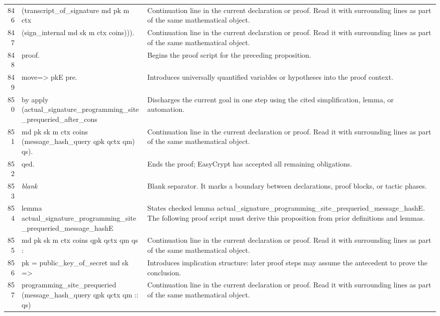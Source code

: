 \documentclass[10pt]{article}
\begin{document}
\begin{longtable}{r L{0.53\textwidth} L{0.37\textwidth}}
846 & {\ttfamily\scriptsize       (transcript\_of\_signature md pk m ctx} & Continuation line in the current declaration or proof.  Read it with surrounding lines as part of the same mathematical object. \\
847 & {\ttfamily\scriptsize         (sign\_internal md sk m ctx coins))).} & Continuation line in the current declaration or proof.  Read it with surrounding lines as part of the same mathematical object. \\
848 & {\ttfamily\scriptsize proof.} & Begins the proof script for the preceding proposition. \\
849 & {\ttfamily\scriptsize move=> pkE pre.} & Introduces universally quantified variables or hypotheses into the proof context. \\
850 & {\ttfamily\scriptsize by apply (actual\_signature\_programming\_site\_prequeried\_after\_cons} & Discharges the current goal in one step using the cited simplification, lemma, or automation. \\
851 & {\ttfamily\scriptsize             md pk sk m ctx coins (message\_hash\_query qpk qctx qm) qs).} & Continuation line in the current declaration or proof.  Read it with surrounding lines as part of the same mathematical object. \\
852 & {\ttfamily\scriptsize qed.} & Ends the proof; EasyCrypt has accepted all remaining obligations. \\
853 & {\ttfamily\scriptsize \emph{blank}} & Blank separator.  It marks a boundary between declarations, proof blocks, or tactic phases. \\
854 & {\ttfamily\scriptsize lemma actual\_signature\_programming\_site\_prequeried\_message\_hashE} & States checked lemma actual\_signature\_programming\_site\_prequeried\_message\_hashE.  The following proof script must derive this proposition from prior definitions and lemmas. \\
855 & {\ttfamily\scriptsize   md pk sk m ctx coins qpk qctx qm qs :} & Continuation line in the current declaration or proof.  Read it with surrounding lines as part of the same mathematical object. \\
856 & {\ttfamily\scriptsize   pk = public\_key\_of\_secret md sk =>} & Introduces implication structure: later proof steps may assume the antecedent to prove the conclusion. \\
857 & {\ttfamily\scriptsize   programming\_site\_prequeried (message\_hash\_query qpk qctx qm :: qs)} & Continuation line in the current declaration or proof.  Read it with surrounding lines as part of the same mathematical object. \\

\end{longtable}
\end{document}

